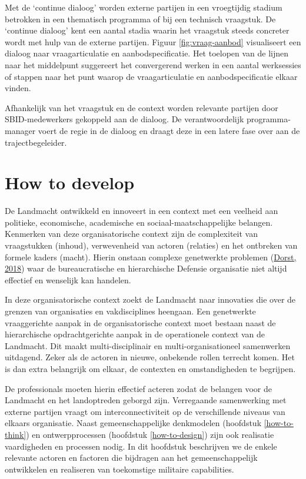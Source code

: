 \documentclass[
]{book}
\begin{document}
Met de `continue dialoog' worden externe partijen in een vroegtijdig stadium betrokken in een thematisch programma of bij een technisch vraagstuk. De `continue dialoog' kent een aantal stadia waarin het vraagstuk steeds concreter wordt met hulp van de externe partijen. Figuur \ref{fig:vraag-aanbod} visualiseert een dialoog naar vraagarticulatie en aanbodspecificatie. Het toelopen van de lijnen naar het middelpunt suggereert het convergerend werken in een aantal werksessies of stappen naar het punt waarop de vraagarticulatie en aanbodspecificatie elkaar vinden.

Afhankelijk van het vraagstuk en de context worden relevante partijen door SBID-medewerkers gekoppeld aan de dialoog. De verantwoordelijk programma-manager voert de regie in de dialoog en draagt deze in een latere fase over aan de trajectbegeleider.

\hypertarget{how-to-develop}{%
\chapter{How to develop}\label{how-to-develop}}

De Landmacht ontwikkeld en innoveert in een context met een veelheid aan politieke, economische, academische en sociaal-maatschappelijke belangen. Kenmerken van deze organisatorische context zijn de complexiteit van vraagstukken (inhoud), verwevenheid van actoren (relaties) en het ontbreken van formele kaders (macht). Hierin onstaan complexe genetwerkte problemen (\protect\hyperlink{ref-dorst_mixing_2018}{Dorst, 2018}) waar de bureaucratische en hierarchische Defensie organisatie niet altijd effectief en wenselijk kan handelen.

In deze organisatorische context zoekt de Landmacht naar innovaties die over de grenzen van organisaties en vakdisciplines heengaan. Een genetwerkte vraaggerichte aanpak in de organisatorische context moet bestaan naast de hierarchische opdrachtgerichte aanpak in de operationele context van de Landmacht. Dit maakt multi-disciplinair en multi-organisationeel samenwerken uitdagend. Zeker als de actoren in nieuwe, onbekende rollen terrecht komen. Het is dan extra belangrijk om elkaar, de contexten en omstandigheden te begrijpen.

De professionals moeten hierin effectief acteren zodat de belangen voor de Landmacht en het landoptreden geborgd zijn. Verregaande samenwerking met externe partijen vraagt om interconnectiviteit op de verschillende niveaus van elkaars organisatie. Naast gemeenschappelijke denkmodelen (hoofdstuk \ref{how-to-think}) en ontwerpprocessen (hoofdstuk \ref{how-to-design}) zijn ook realisatie vaardigheden en processen nodig. In dit hoofdstuk beschrijven we de enkele relevante actoren en factoren die bijdragen aan het gemeenschappelijk ontwikkelen en realiseren van toekomstige militaire capabilities.
\end{document}
